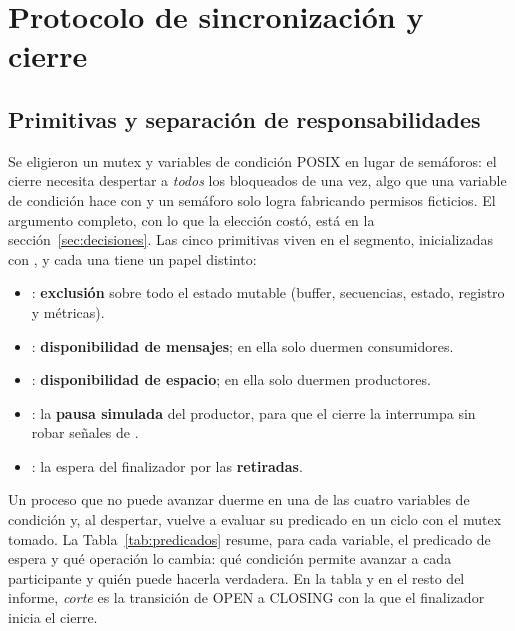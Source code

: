\section{Protocolo de sincronización y cierre}
\label{sec:protocolo}

\subsection{Primitivas y separación de responsabilidades}

Se eligieron un mutex y variables de condición POSIX en lugar de semáforos:
el cierre necesita despertar a \emph{todos} los bloqueados de una vez, algo
que una variable de condición hace con  y un semáforo solo
logra fabricando permisos ficticios. El argumento completo, con lo que la
elección costó, está en la sección~\ref{sec:decisiones}. Las cinco
primitivas viven en el segmento, inicializadas con , y cada una
tiene un papel distinto:

\begin{itemize}
  \item {}: \textbf{exclusión} sobre todo el estado mutable
  (buffer, secuencias, estado, registro y métricas).
  \item {}: \textbf{disponibilidad de mensajes}; en ella
  solo duermen consumidores.
  \item {}: \textbf{disponibilidad de espacio}; en ella solo
  duermen productores.
  \item {}: la \textbf{pausa simulada} del productor, para que
  el cierre la interrumpa sin robar señales de .
  \item {}: la espera del finalizador por las
  \textbf{retiradas}.
\end{itemize}

Un proceso que no puede avanzar duerme en una de las cuatro variables de
condición y, al despertar, vuelve a evaluar su predicado en un ciclo
 con el mutex tomado. La Tabla~\ref{tab:predicados} resume,
para cada variable, el predicado de espera y qué operación lo cambia:
qué condición permite avanzar a cada participante y quién puede hacerla
verdadera. En la tabla y en el resto del informe, \emph{corte} es la
transición de OPEN a CLOSING con la que el finalizador inicia el cierre.


